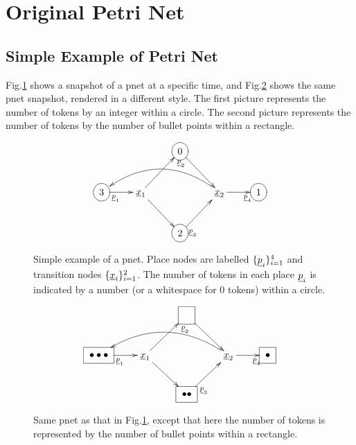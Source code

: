 \section{Original Petri Net}
\subsection{Simple Example of Petri Net}

Fig.\ref{fig-original-pnet-eg-circle}
shows a snapshot of a pnet at a specific time,
and
Fig.\ref{fig-original-pnet-eg-square}
shows the same pnet snapshot, rendered in a different style. The first picture
represents the number of tokens by an integer within a circle.
The second picture represents the number of
tokens by  the number of bullet points within
a rectangle.

\begin{figure}[h!]
$$
\xymatrix{
&&*++[o][F-]{0}\ar[rd]
\\
*++[o][F-]{3}\ar[r]_<<<{\rvp_1}
&\rvx_1\ar[ur]_>{\rvp_2}
\ar[dr]
&&\rvx_2\ar[r]_>>{\rvp_4}
\ar@/_2pc/[lll]
&*++[o][F-]{1}
\\
&&*++[o][F-]{2}\ar[ur]_<{\rvp_3}
}$$
\caption{Simple example of a pnet.
Place nodes are labelled $\{\rvp_i\}_{i=1}^{4}$ and 
transition nodes $\{\rvx_i\}_{i=1}^2$.  The number of tokens in each place $\rvp_i$
is indicated by a number (or a whitespace for 0 tokens) within a circle.}
\label{fig-original-pnet-eg-circle}
\end{figure}


\begin{figure}[h!]
$$
\xymatrix{
&&*++[F-]{\phantom{0}}\ar[rd]
\\
*++[F-]{\bullet\bullet\bullet}\ar[r]_<<<{\rvp_1}
&\rvx_1\ar[ur]_>{\rvp_2}
\ar[dr]
&&\rvx_2\ar[r]_>>{\rvp_4}
\ar@/_2pc/[lll]
&*++[F-]{\bullet}
\\
&&*++[F-]{\bullet\bullet}\ar[ur]_<<{\rvp_3}
}
$$
\caption{Same pnet as that in Fig.\ref{fig-original-pnet-eg-circle},
except that here
the number of tokens is represented by the number of bullet points within a rectangle.}
\label{fig-original-pnet-eg-square}
\end{figure}

